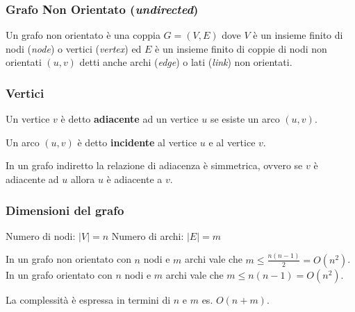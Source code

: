         \subsubsection{Grafo Non Orientato (\textit{undirected})}
            \begin{definition}
                Un grafo non orientato è una coppia $G = (V, E)$ dove $V$ è un insieme finito di nodi (\textit{node}) o vertici (\textit{vertex}) ed $E$ è un insieme finito di coppie di nodi non orientati $(u,v)$ detti anche archi (\textit{edge}) o lati (\textit{link}) non orientati.
            \end{definition}
        \subsubsection{Vertici}
            \begin{definition}[Adiacenza]
                Un vertice $v$ è detto \textbf{adiacente} ad un vertice $u$ se esiste un arco $(u,v)$.
            \end{definition}
            \begin{definition}[Incidenza]
                Un arco $(u,v)$ è detto \textbf{incidente} al vertice $u$ e al vertice $v$.
            \end{definition}
            In un grafo indiretto la relazione di adiacenza è simmetrica, ovvero se $v$ è adiacente ad $u$ allora $u$ è adiacente a $v$.
        \subsubsection{Dimensioni del grafo}
            Numero di nodi: $|V| = n$ \newline
            Numero di archi: $|E| = m$
            \begin{theorem}
                In un grafo non orientato con $n$ nodi e $m$ archi vale che $m \leq \frac{n(n-1)}{2} = O(n^2)$.\newline
                In un grafo orientato con $n$ nodi e $m$ archi vale che $m \leq n(n-1) = O(n^2)$.
            \end{theorem}
            La complessità è espressa in termini di $n$ e $m$ es. $O(n+m)$.
